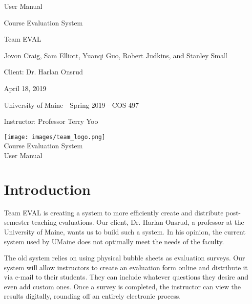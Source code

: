\documentclass{article}
\begin{document}
\begin{titlepage}

\centering
\vspace*{2cm}
{\Huge User Manual\par}
\vspace{.25cm}
{\LARGE Course Evaluation System\par}
\vspace{1cm}
{\Large Team EVAL\par}
\vspace{.2cm}
{\Large Jovon Craig, Sam Elliott, Yuanqi Guo, Robert Judkins, and Stanley Small\par}
\vspace{1cm}
{\Large Client: Dr. Harlan Onsrud\par}
\vspace{1cm}
{\Large April 18, 2019\par}
\vspace{11cm}

University of Maine - Spring 2019 - COS 497

Instructor: Professor Terry Yoo

\end{titlepage}

\newpage

\begin{center}
{\texttt{[image: images/team\_logo.png]}} \\ 	\bigskip
{\LARGE Course Evaluation System } \\ \medskip
{\large User Manual } \\ \medskip
\end{center}

\tableofcontents

\newpage

\section{Introduction}

Team EVAL is creating a system to more efficiently create and distribute post-semester teaching evaluations. Our client, Dr. Harlan Onsrud, a professor at the University of Maine, wants us to build such a system. In his opinion, the current system used by UMaine does not optimally meet the needs of the faculty.

The old system relies on using physical bubble sheets as evaluation surveys. Our system will allow instructors to create an evaluation form online and distribute it via e-mail to their students. They can include whatever questions they desire and even add custom ones. Once a survey is completed, the instructor can view the results digitally, rounding off an entirely electronic process.
  
\end{document}
